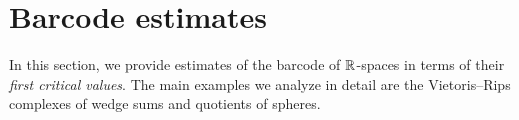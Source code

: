 
\section{Barcode estimates}\label{s:computations}

In this section, we provide estimates of the barcode of $\mathbb{R}$-spaces in terms of their \textit{first critical values}.
The main examples we analyze in detail are the Vietoris--Rips complexes of wedge sums and quotients of spheres.




